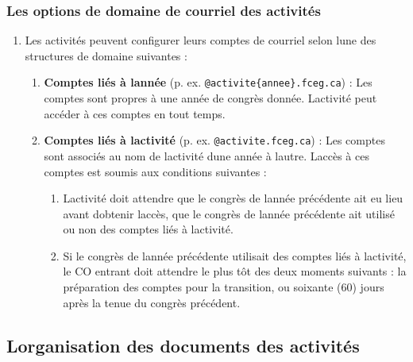 \subsubsection{Les options de domaine de courriel des activités}
\label{les-options-de-domaine-de-courriel-des-activites}

\begin{enumerate}
 \item
  Les activités peuvent configurer leurs comptes de courriel selon l\textquotesingle une des structures de domaine suivantes :

  \begin{enumerate}
   \item
    \textbf{Comptes liés à l\textquotesingle année} (p. ex. \texttt{@activite\{annee\}.fceg.ca}) : Les comptes sont propres à une année de congrès donnée. L\textquotesingle activité peut accéder à ces comptes en tout temps.
   \item
    \textbf{Comptes liés à l\textquotesingle activité} (p. ex. \texttt{@activite.fceg.ca}) : Les comptes sont associés au nom de l\textquotesingle activité d\textquotesingle une année à l\textquotesingle autre. L\textquotesingle accès à ces comptes est soumis aux conditions suivantes :
    \begin{enumerate}
     \item
      L\textquotesingle activité doit attendre que le congrès de l\textquotesingle année précédente ait eu lieu avant d\textquotesingle obtenir l\textquotesingle accès, que le congrès de l\textquotesingle année précédente ait utilisé ou non des comptes liés à l\textquotesingle activité.
     \item
      Si le congrès de l\textquotesingle année précédente utilisait des comptes liés à l\textquotesingle activité, le CO entrant doit attendre le plus tôt des deux moments suivants : la préparation des comptes pour la transition, ou soixante (60) jours après la tenue du congrès précédent.
    \end{enumerate}
  \end{enumerate}
\end{enumerate}

\subsection{L\textquotesingle organisation des documents des activités}
\label{lorganisation-des-documents-des-activites}

